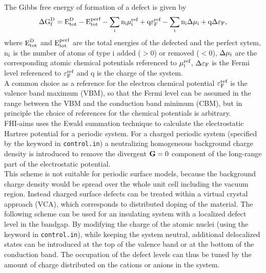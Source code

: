The Gibbs free energy of formation of a defect is given by
\begin{align}%
\Delta {\Gupr}_{\fupr}^{\Dupr}={\Eupr}_{\totupr}^{\Dupr}-{\Eupr}_{\totupr}^{\perfupr}-\sum\limits_{\iupr}{\text{n}_{\iupr}{\mu}_{\iupr}^{\text{ref}}}+\text{q} {\varepsilon}_{\Fupr}^{\text{ref}}-\sum\limits_{\iupr}{\text{n}_{\iupr}\Delta {\mu}_{\iupr}}+\text{q} \Delta {\varepsilon}_{\Fupr},
\end{align}
where ${\text{E}}_{\text{tot}}^{\text{D}}$ and ${\text{E}}_{\text{tot}}^{\text{perf}}$ are the total energies of the defected and the perfect sytem, n$_{\text{i}}$ is the number of atoms of type i added ($>0$) or removed ($<0$), $\Delta {\mu}_{\text{i}}$ are the corresponding atomic chemical potentials referenced to ${\mu}_{\text{i}}^{\text{ref}}$, $\Delta {\varepsilon}_{\text{F}}$ is the Fermi level referenced to ${\varepsilon}_{\text{F}}^{\text{ref}}$ and 
$\text{q}$ is the charge of the system.\\
A common choice as a reference for the electron chemical potential ${\varepsilon}_{\text{F}}^{\text{ref}}$ is the valence band maximum (VBM), so that the Fermi level can be assumed in the range between the VBM and the conduction band minimum (CBM), but in principle the choice of references for the chemical potentials is arbitrary.\\
FHI-aims uses the Ewald summation technique to calculate the electrostatic Hartree potential for a periodic system. For a charged periodic system (specified by the keyword  in \texttt{control.in}) a neutralizing homogeneous background charge density is introduced to remove the divergent ${\bf G}=0$ component of the long-range part of the electrostatic potential.\\
This scheme is not suitable for periodic surface models, because the background charge density would be spread over the whole unit cell including the vacuum region.
Instead charged surface defects can be treated within a virtual crystal approach (VCA), which corresponds to distributed doping of the material. The following scheme can be used for an insulating system with a localized defect level in the bandgap. By modifying the charge of the atomic nuclei (using the keyword  in \texttt{control.in}), while keeping the system neutral, additional delocalized states can be introduced at the top of the valence band or at the bottom of the conduction band. The occupation of the defect levels can thus be tuned by the amount of charge distributed on the cations or anions in the system. 
